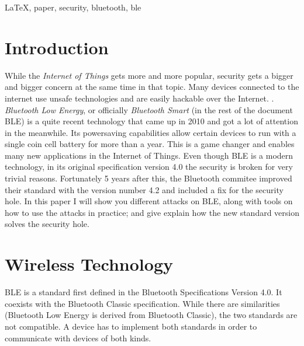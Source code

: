 \documentclass[conference]{IEEEtran}
\begin{document}
\begin{IEEEkeywords}
\LaTeX, paper, security, bluetooth, ble
\end{IEEEkeywords}






%
\IEEEpeerreviewmaketitle



\section{Introduction}
While the \emph{Internet of Things} gets more and more popular, security gets a bigger and bigger concern at the same time in that topic. Many devices connected to the internet use unsafe technologies and are easily hackable over the Internet. \cite{iotsecanalysis}. \emph{Bluetooth Low Energy}, or officially \emph{Bluetooth Smart} (in the rest of the document BLE) is a quite recent technology that came up in 2010 and got a lot of attention in the meanwhile. Its powersaving capabilities allow certain devices to run with a single coin cell battery for more than a year\cite{blelowpower}. This is a game changer and enables many new applications in the Internet of Things. Even though BLE is a modern technology, in its original specification version 4.0 the security is broken for very trivial reasons. Fortunately 5 years after this, the Bluetooth commitee improved their standard with the version number 4.2 and included a fix for the security hole\cite{ble42}\cite{ble42announcement}. In this paper I will show you different attacks on BLE, along with tools on how to use the attacks in practice; and give explain how the new standard version solves the security hole.

\section{Wireless Technology}

BLE is a standard first defined in the Bluetooth Specifications Version 4.0. It coexists with the Bluetooth Classic specification. While there are similarities (Bluetooth Low Energy is derived from Bluetooth Classic), the two standards are not compatible. A device has to implement both standards in order to communicate with devices of both kinds.
\end{document}
